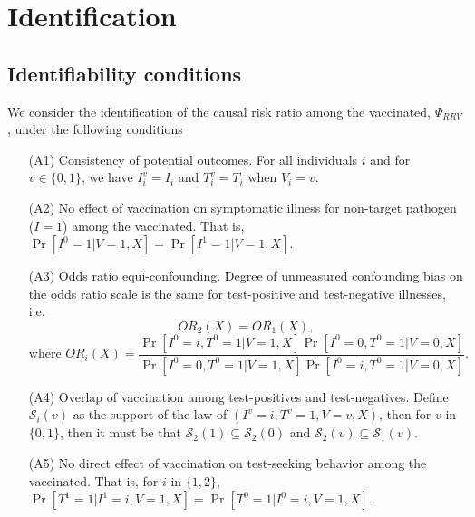 \documentclass[11pt]{article}
\begin{document}
\section{Identification} \label{sec:identification}
\subsection{Identifiability conditions} \label{sec:conditions}
We consider the identification of the causal risk ratio among the vaccinated, $\Psi_{RRV}$, under the following conditions
\begin{itemize}
    \item[(A1)] Consistency of potential outcomes. For all individuals $i$ and for $v \in \{0, 1\}$, we have $I_i^v = I_i$ and $T_i^v = T_i$ when $V_i = v$.
    \item[(A2)] No effect of vaccination on symptomatic illness for non-target pathogen ($I = 1$) among the vaccinated. That is, $\Pr[I^0 = 1 | V = 1, X] = \Pr[I^1 = 1 | V = 1, X].$
    \item[(A3)] Odds ratio equi-confounding. Degree of unmeasured confounding bias on the odds ratio scale is the same for test-positive and test-negative illnesses, i.e. 
    $$OR_2(X) = OR_1(X), $$
    $$ \text{where } OR_i(X) = \frac{\Pr[I^0 = i, T^0 = 1 | V = 1, X]\Pr[I^0 = 0, T^0 = 1 | V = 0, X]}{\Pr[I^0 = 0, T^0 = 1 | V = 1, X]\Pr[I^0 = i, T^0 = 1| V = 0, X]}.$$
    \item[(A4)] Overlap of vaccination among test-positives and test-negatives. Define $\mathcal{S}_i(v)$ as the support of the law of $(I^v = i, T^v = 1, V = v, X)$, then for $v$ in $\{0,1\}$, then it must be that $\mathcal{S}_2(1) \subseteq \mathcal{S}_2(0)$ and $\mathcal{S}_2(v) \subseteq \mathcal{S}_1(v).$
    \item[(A5)] No direct effect of vaccination on test-seeking behavior among the vaccinated. That is, for $i$ in $\{1,2\}$, $\Pr[T^1 = 1 | I^1 = i, V = 1, X] = \Pr[T^0 = 1 | I^0 = i, V = 1, X].$
\end{itemize}
\end{document}
